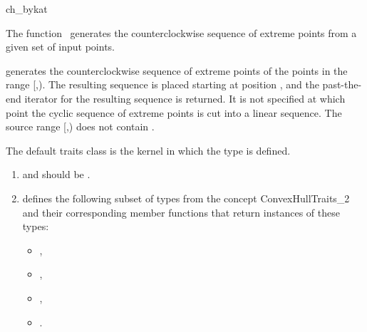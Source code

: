 
\begin{ccRefFunction}{ch_bykat}  

\ccDefinition
  
The function \ccRefName\ generates the counterclockwise sequence of extreme
points from a given set of input points.



            {generates the counterclockwise sequence of extreme points
            of the points in the range [,).
            The resulting sequence is placed starting at position
            , and the past-the-end iterator for the resulting
            sequence is returned. It is not specified at which point the
            cyclic sequence of extreme points is cut into a linear sequence.
            \ccPrecond %
            The source range [,) does not contain
            .}

The default traits class  is the kernel in which the
type  is defined.


\begin{enumerate}
   \item    {} and 
            should be .
   \item    {} defines the following subset of types from
            the concept ConvexHullTraits\_2 and their corresponding member
            functions that return instances of these types:
            \begin{itemize}
                \item {},
                \item {},
                \item {}, 
                \item {}.
            \end{itemize}
\end{enumerate}


\end{ccRefFunction}
